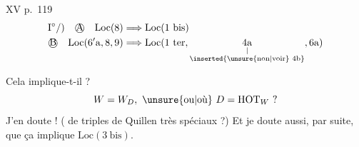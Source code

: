 XV p.~119
\[
\begin{aligned}
\mathrm{I}^{\circ}/)\quad\text{\textcircled{A}}\quad\mathrm{Loc}(8)&\Longrightarrow\mathrm{Loc}(1\ \mathrm{bis})\\
\text{\textcircled{B}}\quad\mathrm{Loc}(6'\mathrm{a},8,9)&\Longrightarrow
\mathrm{Loc}(1\ \mathrm{ter},\underset{\substack{\vert\\\inserted{\text{\unsure{non|voir} }4\mathrm{b}}}}{4\mathrm{a}},6\mathrm{a})
\end{aligned}
\]

Cela implique-t-il  ?
\[
W=W_D,\ \text{\unsure{ou|où} }D=\mathrm{HOT}_{W}\ ?
\]
J'en doute ! ( de triples de Quillen très spéciaux ?)
Et je doute aussi, par suite, que ça implique $\mathrm{Loc}(3\ \mathrm{bis})$.

